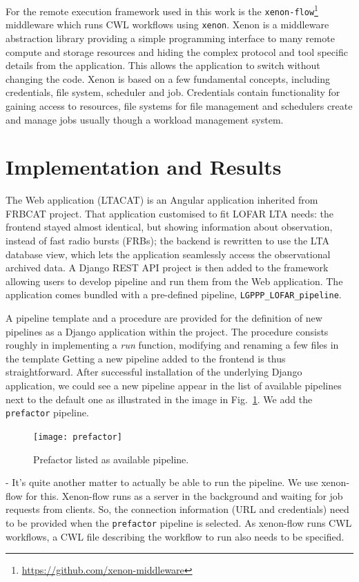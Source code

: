 \documentclass[conference]{IEEEtran}
\newcommand{\tit}[1]{\textit{#1}}
\newcommand{\thi}[1]{\texttt{#1}}
\begin{document}
For the remote execution framework used in this work is the \thi{xenon-flow}\footnote{\url{https://github.com/xenon-middleware}} middleware which runs CWL workflows using \thi{xenon}\cite{jason_maassen_2015_35415}. Xenon is a middleware abstraction library providing a simple programming interface to many remote compute and storage resources and hiding the complex protocol and tool specific details from the application. This allows the application to switch without changing the code. Xenon is based on a few fundamental concepts, including credentials, file system, scheduler and job. Credentials contain functionality for gaining access to resources, file systems for file management and schedulers create and manage jobs usually though a workload management system.

\section{Implementation and Results}
The Web application (LTACAT) is an Angular application inherited from FRBCAT project. That application customised to fit LOFAR LTA needs: the frontend stayed almost identical, but showing information about observation, instead of fast radio bursts (FRBs); the backend is rewritten to use the LTA database view, which lets the application seamlessly access the observational archived data. A Django REST API project is then added to the framework allowing users to develop pipeline and run them from the Web application. The application comes bundled with a pre-defined pipeline, \thi{LGPPP\_LOFAR\_pipeline}.

 A pipeline template and a procedure are provided for the definition of new pipelines as a Django application within the project. The procedure consists roughly in implementing a \tit{run} function, modifying and renaming a few files in the template Getting a new pipeline added to the frontend is thus straightforward. After successful installation of the underlying Django application, we could see a new pipeline appear in the list of available pipelines next to the default one as illustrated in the image in Fig.~\ref{pfp}. We add the \thi{prefactor} pipeline.

\begin{figure}[htbp]
\centerline{\texttt{[image: prefactor]}}
\caption{Prefactor listed as available pipeline.}
\label{pfp}
\end{figure}

- It’s quite another matter to actually be able to run the pipeline. We use xenon-flow for this. Xenon-flow runs as a server in the background and waiting for job requests from clients. So, the connection information (URL and credentials) need to be provided when the \thi{prefactor} pipeline is selected. As xenon-flow runs CWL workflows, a CWL file describing the workflow to run also needs to be specified.
\end{document}
